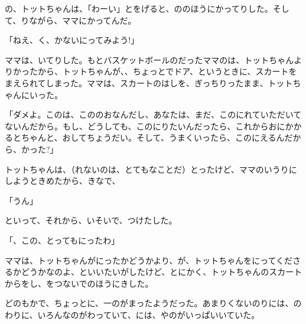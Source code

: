 の、トットちゃんは、「わーい」とをげると、ののほうにかってりした。そして、りながら、ママにかってんだ。

「ねえ、く、かないにってみよう!」

ママは、いてりした。もとバスケットボールのだったママのは、トットちゃんよりかったから、トットちゃんが、、ちょっとでドア、というときに、スカートをまえられてしまった。ママは、スカートのはしを、ぎっちりったまま、トットちゃんにいった。

「ダメよ。このは、こののおなんだし、あなたは、まだ、このにれていただいてないんだから。もし、どうしても、このにりたいんだったら、これからおにかかるとちゃんと、おしてちょうだい。そして、うまくいったら、このにえるんだから、かった?」

トットちゃんは、（れないのは、とてもなことだ）とったけど、ママのいうりにしようときめたから、きなで、

「うん」

といって、それから、いそいで、つけたした。

「、この、とってもにったわ」

ママは、トットちゃんがにったかどうかより、が、トットちゃんをにってくださるかどうかなのよ、といいたいがしたけど、とにかく、トットちゃんのスカートからをし、をつないでのほうにきした。

どのもかで、ちょっとに、一のがまったようだった。あまりくないのりには、のわりに、いろんなのがわっていて、には、やのがいっぱいいていた。


